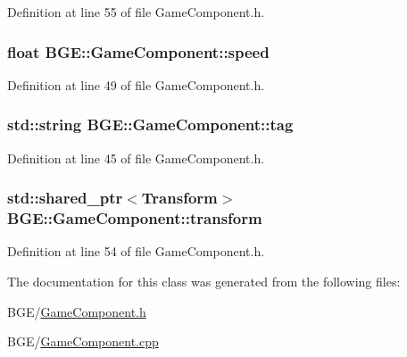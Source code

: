 Definition at line 55 of file Game\-Component.\-h.

\hypertarget{class_b_g_e_1_1_game_component_ab7b2e5aacc2e17f5ba824712d6603b5c}{
\subsubsection[{speed}]{\setlength{\rightskip}{0pt plus 5cm}float B\-G\-E\-::\-Game\-Component\-::speed}}\label{class_b_g_e_1_1_game_component_ab7b2e5aacc2e17f5ba824712d6603b5c}


Definition at line 49 of file Game\-Component.\-h.

\hypertarget{class_b_g_e_1_1_game_component_a7934229e91ebc58e91c6393860df70ee}{
\subsubsection[{tag}]{\setlength{\rightskip}{0pt plus 5cm}std\-::string B\-G\-E\-::\-Game\-Component\-::tag}}\label{class_b_g_e_1_1_game_component_a7934229e91ebc58e91c6393860df70ee}


Definition at line 45 of file Game\-Component.\-h.

\hypertarget{class_b_g_e_1_1_game_component_a085d32f2b004c05bca56f962b5bb7bd8}{
\subsubsection[{transform}]{\setlength{\rightskip}{0pt plus 5cm}std\-::shared\-\_\-ptr$<${\bf Transform}$>$ B\-G\-E\-::\-Game\-Component\-::transform}}\label{class_b_g_e_1_1_game_component_a085d32f2b004c05bca56f962b5bb7bd8}


Definition at line 54 of file Game\-Component.\-h.



The documentation for this class was generated from the following files\-:\begin{DoxyCompactItemize}
\item 
B\-G\-E/\hyperlink{_game_component_8h}{Game\-Component.\-h}\item 
B\-G\-E/\hyperlink{_game_component_8cpp}{Game\-Component.\-cpp}\end{DoxyCompactItemize}
